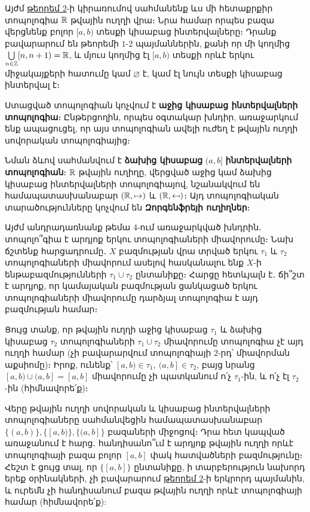 \documentclass[./main.tex]{subfiles}
\begin{document}
\par Այժմ \hyperref[ch5thm2]{թեորեմ 2}-ի կիրառումով սահմանենք ևս մի հետաքրքիր տոպո\-լոգիա $\mathbb{R}$ թվային ուղղի վրա։ Նրա համար որպես բազա վերցնենք բոլոր $[a, b)$ տեսքի կիսա\-բաց ին\-տեր\-վալ\-նե\-րը։ Դրանք բավարարում են թեորեմի $1$-$2$ պայմաններին, քանի որ մի կողմից $\bigcup\limits_{n\in \mathbb{Z}} [n, n+1)=\mathbb{R}$, և մյուս կողմից էլ $[a, b)$ տեսքի որևէ երկու միջակայքերի հատումը կամ $\varnothing$ է, կամ էլ նույն տեսքի կիսաբաց ինտերվալ է։
\par Ստացված տոպո\-լոգիան կոչվում է \textbf{աջից կիսաբաց ինտերվալների տոպո\-լոգիա}։ Ընթերցողին, որպես օգտակար խնդիր, առաջարկում ենք ապացուցել, որ այս տո\-պո\-լո\-գիան ավելի ուժեղ է թվային ուղղի սովորական տոպո\-լոգիայից։
\par Նման ձևով սահմանվում է \textbf{ձախից կիսաբաց} $(a, b]$ \textbf{ինտերվալների տոպո\-լո\-գիան}։ $\mathbb{R}$ թվային ուղիղը, վերցված աջից կամ ձախից կիսաբաց ինտերվալների տոպոլո\-գիա\-յով, նշանակվում են համապատասխանաբար $(\mathbb{R}, \mapsto)$ և $(\mathbb{R}, \mapsfrom)$։ Այդ \linebreak տոպոլոգիական տարածությունները կոչվում են \textbf{Զորգենֆրեյի ուղիղներ}։
\par Այժմ անդրադառնանք թեմա 4-ում առաջարկված խնդրին․ տոպոլո՞գիա է արդյոք երկու տոպոլոգիաների միավորումը։ Նախ ճշտենք հարցադրումը․ $X$ բազմության վրա տրված երկու $\tau_1$ և $\tau_2$ տոպոլոգիաների միավորում ասելով հասկանալու ենք $X\textrm{-ի}$ ենթաբազմությունների $\tau_1 \cup \tau_2$ ընտանիքը։ Հարցը հետևյալն է․ ճի՞շտ է արդյոք, որ կամայական բազմության ցանկացած երկու տոպոլոգիաների միավորումը դարձյալ տոպոլոգիա է այդ բազմության համար։
\par Ցույց տանք, որ թվային ուղղի աջից կիսաբաց $\tau_1$ և ձախից կիսաբաց $\tau_2$ տոպոլո\-գիա\-ների $\tau_1 \cup \tau_2$ միավորումը տոպոլոգիա չէ այդ ուղղի համար (չի բավարարվում տոպոլոգիայի 2-րդ՝ միավորման աքսիոմը)։ Իրոք, ունենք՝ $[a, b)\in \tau_1,\ (a, b]\in \tau_2$, բայց նրանց $[a, b)\cup (a, b]=[a, b]$ միավորումը չի պատկանում ո՛չ $\tau_1$-ին, և ո՛չ էլ $\tau_2$-ին (հիմնավորե՛ք)։

\par Վերը թվային ուղղի սովորական և կիսաբաց ինտերվալների տոպոլոգիաները սահմանվեցին համապատասխանաբար $\{(a, b)\}, \{[a, b)\}, \{(a, b]\}$ բազաների միջոցով։ Դրա հետ կապված առաջանում է հարց․ հանդիսանո՞ւմ է արդյոք  թվային ուղղի որևէ տոպոլոգիայի բազա բոլոր $[a, b]$ փակ հատվածների բազմությունը։ Հեշտ է ցույց տալ, որ $\{[a, b]\}$ ընտանիքը, ի տարբերություն նախորդ երեք օրինակների, չի բավարարում \hyperref[ch5thm2]{թեորեմ 2}-ի երկրորդ պայմանին, և ուրեմն չի հանդիսանում բազա թվային ուղղի որևէ տոպոլոգիայի համար (հիմնավորե՛ք):
\end{document}
